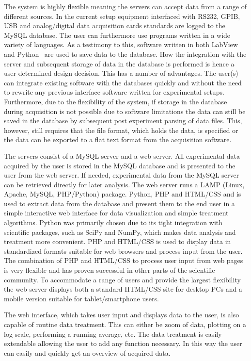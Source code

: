 The system is highly flexible meaning the servers can accept data from a range
of different sources. In the current setup equipment interfaced with RS232,
GPIB, USB and analog/digital data acquisition cards standards are logged to the
MySQL database. The user can furthermore use programs written in a wide variety
of languages. As a testimony to this, software written in both LabView and
Python~\cite{python} are used to save data to the database. How the integration
with the server and subsequent storage of data in the database is performed is
hence a user determined design decision. This has a number of advantages.  The
user(s) can integrate existing software with the databases quickly and without
the need to rewrite any previous interface software written for experimental
setups. Furthermore, due to the flexibility of the system, if storage in the
database during acquisition is not possible due to software limitations the
data can still be saved in the database by subsequent post experiment parsing
of data files. This, however, still requires that the file format, which holds
the data, is specified or the data can be exported to a flat text format from
the acquisition software.

The servers consist of a MySQL server and a web server. All experimental data
acquired by the user is stored in the MySQL database and is presented to the
user from the web server. If needed, experimental data from the MySQL server
can be retrieved directly for later analysis. The web server runs a LAMP
(Linux, Apache, MySQL, PHP/Python) package. Python, PHP and HTML/CSS and is
used to extract data from the database and present them to the end user in a
simple interactive web interface for data visualization and simple treatment
algorithms. Python was primarily chosen due to its tight integration with
scientific packages, such as SciPy and NumPy, which makes data analysis and
treatment more convenient\cite{Cahn2007}. PHP and HTML/CSS is used to display
data in standardized formats suitable for web browsers and process input from
the user. The combination of PHP and HTML/CSS to process user input from web
pages is very flexible and has proven successful in other parts of the
scientific community\cite{Crane2008}. To accommodate a range of users and
provide the largest flexibility the web server displays both a standard HTML/CSS
site for desktop PCs and a mobile version suitable for tablet/smartphone users.


The web interface, which takes user input and displays data to the user, is also
capable of routine data treatment. This can either be zoom of data, plotting on
a log scale, performing a running average, etc. The data treatment is easily
extendable allowing the user to add any function necessary. In this way the
user can easily and quickly get an overview of acquired data.
